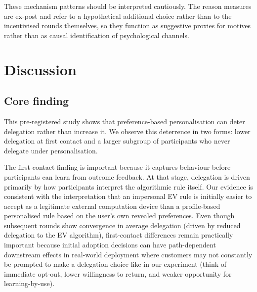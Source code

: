 \documentclass[a4paper, 12pt, fleqn]{article}
\theoremstyle{hypstyle}
\begin{document}
These mechanism patterns should be interpreted cautiously. The reason measures are ex-post and refer to a hypothetical additional choice rather than to the incentivised rounds themselves, so they function as suggestive proxies for motives rather than as causal identification of psychological channels.




\section{Discussion}
\label{sec:discussion}

\subsection{Core finding}
This pre-registered study shows that preference-based personalisation can deter delegation rather than increase it. We observe this deterrence in two forms: lower delegation at first contact and a larger subgroup of participants who never delegate under personalisation.

The first-contact finding is important because it captures behaviour before participants can learn from outcome feedback. At that stage, delegation is driven primarily by how participants interpret the algorithmic rule itself. Our evidence is consistent with the interpretation that an impersonal EV rule is initially easier to accept as a legitimate external computation device than a profile-based personalised rule based on the user's own revealed preferences. Even though subsequent rounds show convergence in average delegation (driven by reduced delegation to the EV algorithm), first-contact differences remain practically important because initial adoption decisions can have path-dependent downstream effects in real-world deployment where customers may not constantly be prompted to make a delegation choice like in our experiment (think of immediate opt-out, lower willingness to return, and weaker opportunity for learning-by-use).
\end{document}

